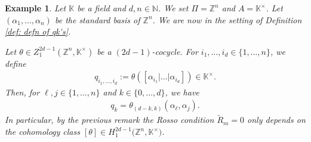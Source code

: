 \documentclass[pdftex]{sigma}
\numberwithin{equation}{section}
\newtheorem{Example}[Theorem]{Example}
\newcommand{\NN }{\mathbb{N}}
\newcommand{\ZZ }{\mathbb{Z}}
\newcommand{\KK }{\mathbb{K}}
\begin{document}
\begin{Example} \label{ex: Rosso condition depends on Cohclass}
 Let $\KK$ be a field and $d,n \in \NN$. We set $\Pi=\ZZ^n$ and $A=\KK^\times$. Let $(\alpha_1,\dots, \alpha_n)$ be the standard basis of $\ZZ^n$. We are now in the setting of Definition \ref{def: defn of qk's}.

 Let $\theta \in Z^{2d-1}_1(\ZZ^n,\KK^\times)$ be a $(2d-1)$-cocycle. For $i_1, \dots, i_d \in \{1,\dots,n\}$, we define
 \begin{align*}
 q_{i_1,\dots,i_d}:= \theta([\alpha_{i_1}|\dots |\alpha_{i_d}]) \in \KK^\times.
 \end{align*}
 Then, for $\ell,j \in \{1, \dots,n\}$ and $k \in \{0,\dots,d\}$, we have
 \begin{align*}
 q_k = \theta_{(d-k,k)}(\alpha_\ell,\alpha_j).
 \end{align*}
 In particular, by the previous remark the Rosso condition $\tilde{R}_m=0$ only depends on the cohomology class $[\theta] \in H^{2d-1}_1\big(\ZZ^n,\KK^\times\big)$.
\end{Example}
\end{document}
